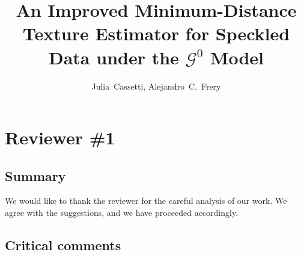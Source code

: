 \documentclass{ar2rc}
\title{An Improved Minimum-Distance Texture Estimator for Speckled Data under the $\mathcal{G}^0$ Model}
\author{Julia~Cassetti,
	Alejandro~C.~Frery}
\begin{document}
	
	\maketitle
	
	\section{Reviewer \#1}
	
	\subsection{Summary}
	

\AR We would like to thank the reviewer for the careful analysis of our work.
We agree with the suggestions, and we have proceeded accordingly.
	
	\subsection{Critical comments}

\end{document}

